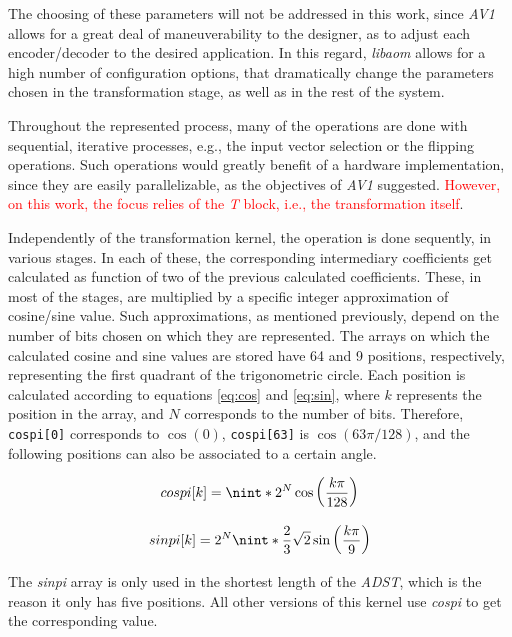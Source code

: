 The choosing of these parameters will not be addressed in this work, since \emph{AV1} allows for a great deal of maneuverability to the designer, as to adjust each encoder/decoder to the desired application. In this regard, \emph{libaom} allows for a high number of configuration options, that dramatically change the parameters chosen in the transformation stage, as well as in the rest of the system.

Throughout the represented process, many of the operations are done with sequential, iterative processes, e.g., the input vector selection or the flipping operations. Such operations would greatly benefit of a hardware implementation, since they are easily parallelizable, as the objectives of \emph{AV1} suggested. \textcolor{red}{However, on this work, the focus relies of the \emph{T} block, i.e., the transformation itself}.

Independently of the transformation kernel, the operation is done sequently, in various stages. In each of these, the corresponding intermediary coefficients get calculated as function of two of the previous calculated coefficients. These, in most of the stages, are multiplied by a specific integer approximation of cosine/sine value. Such approximations, as mentioned previously, depend on the number of bits chosen on which they are represented. The arrays on which the calculated cosine and sine values are stored have 64 and 9 positions, respectively, representing the first quadrant of the trigonometric circle. Each position is calculated according to equations \ref{eq:cos} and \ref{eq:sin}, where $k$ represents the position in the array, and $N$ corresponds to the number of bits. Therefore, \verb|cospi[0]| corresponds to $\cos(0)$, \verb|cospi[63]| is $\cos(63\pi/128)$, and the following positions can also be associated to a certain angle.

\begin{equation} \label{eq:cos}
    cospi[k] = \nint*{2^{N}\cos\left(\frac{k\pi}{128}\right)}
\end{equation}

\begin{equation} \label{eq:sin}
    sinpi[k] = 2^{N}\nint*{\frac{2}{3}\sqrt{2}\sin\left(\frac{k\pi}{9}\right)}
\end{equation}

The \emph{sinpi} array is only used in the shortest length of the \emph{ADST}, which is the reason it only has five positions. All other versions of this kernel use \emph{cospi} to get the corresponding value.

